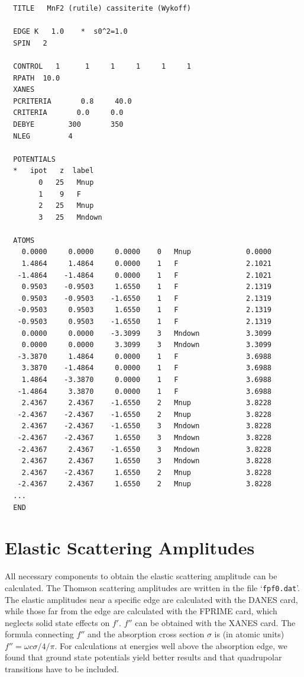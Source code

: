 \documentclass[11pt,oneside]{report} %
\renewcommand{\htmlref}[2]{\hyperlink{#2}{#1}}
\newcommand{\file}[1]{`\texttt{#1}'}
\renewcommand{\htmlref}[2]{{#1}} %
\begin{document}
\begin{verbatim}
  TITLE   MnF2 (rutile) cassiterite (Wykoff)
  
  EDGE K   1.0    *  s0^2=1.0
  SPIN   2
 
  CONTROL   1      1     1     1     1     1
  RPATH  10.0
  XANES
  PCRITERIA       0.8     40.0
  CRITERIA       0.0     0.0  
  DEBYE        300       350
  NLEG         4

  POTENTIALS
  *   ipot   z  label
        0   25   Mnup
        1    9   F
        2   25   Mnup
        3   25   Mndown
 
  ATOMS
    0.0000     0.0000     0.0000    0   Mnup             0.0000
    1.4864     1.4864     0.0000    1   F                2.1021
   -1.4864    -1.4864     0.0000    1   F                2.1021
    0.9503    -0.9503     1.6550    1   F                2.1319
    0.9503    -0.9503    -1.6550    1   F                2.1319
   -0.9503     0.9503     1.6550    1   F                2.1319
   -0.9503     0.9503    -1.6550    1   F                2.1319
    0.0000     0.0000    -3.3099    3   Mndown           3.3099
    0.0000     0.0000     3.3099    3   Mndown           3.3099
   -3.3870     1.4864     0.0000    1   F                3.6988
    3.3870    -1.4864     0.0000    1   F                3.6988
    1.4864    -3.3870     0.0000    1   F                3.6988
   -1.4864     3.3870     0.0000    1   F                3.6988
    2.4367     2.4367    -1.6550    2   Mnup             3.8228
   -2.4367    -2.4367    -1.6550    2   Mnup             3.8228
    2.4367    -2.4367    -1.6550    3   Mndown           3.8228
   -2.4367    -2.4367     1.6550    3   Mndown           3.8228
   -2.4367     2.4367    -1.6550    3   Mndown           3.8228
    2.4367     2.4367     1.6550    3   Mndown           3.8228
    2.4367    -2.4367     1.6550    2   Mnup             3.8228
   -2.4367     2.4367     1.6550    2   Mnup             3.8228
  ...
  END
\end{verbatim}



\section{Elastic Scattering Amplitudes}
\label{sec:DANES}
All necessary components to obtain the elastic scattering amplitude
can be calculated. The Thomson scattering
amplitudes are written in the file \file{fpf0.dat}. The elastic amplitudes
near a specific edge are calculated with the \htmlref{DANES}{card:dan} 
card, while those far from the edge are calculated with the 
\htmlref{FPRIME}{card:fpr} card, which neglects solid state effects on $f'$.
$f''$ can be obtained with the \htmlref{XANES}{card:xan} card. 
The formula connecting $f''$ and the absorption cross section $\sigma $ 
is (in atomic units) $f'' = \omega c \sigma /4/\pi $. For calculations 
at energies well above the absorption edge, we found that ground state 
potentials yield better results and that quadrupolar transitions 
have to be included.
\end{document}
